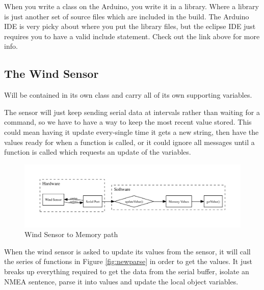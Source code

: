 \documentclass[letterpaper]{article}
\begin{document}
When you write a class on the Arduino, you write it in a library. Where a library is just another set of source files which are included in the build. The Arduino IDE is very picky about where you put the library files, but the eclipse IDE just requires you to have a valid include statement. Check out the link above for more info. 


\subsection{The Wind Sensor} %
\label{sec:The Wind Sensor}

Will be contained in its own class and carry all of its own supporting variables.

The sensor will just keep sending serial data at intervals rather than waiting for a command, so we have to have a way to keep the most recent value stored. This could mean having it update every-single time it gets a new string, then have the values ready for when a function is called, or it could ignore all messages until a function is called which requests an update of the variables.

\begin{figure}[h]
	\centering
	\includegraphics[width=\linewidth]{maps/WindSerial.pdf}
	\caption{Wind Sensor to Memory path}
	\label{fig:WindSensorMap}
\end{figure}

When the wind sensor is asked to update its values from the sensor, it will call the series of functions in Figure \ref{fig:newparse} in order to get the values. It just breaks up everything required to get the data from the serial buffer, isolate an NMEA sentence, parse it into values and update the local object variables.
\end{document}
